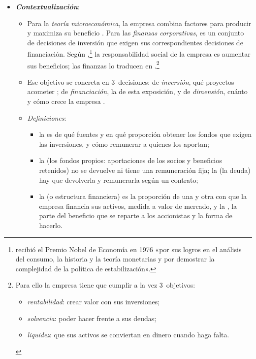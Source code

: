\documentclass[11pt]{article}
\begin{document}
\begin{itemize}
\item \textbf{\emph{Contextualización}}:
  \begin{itemize}
  \item Para la \emph{teoría microeconómica}, la empresa combina factores para producir y maximiza su beneficio . Para las \emph{finanzas corporativas}, es un conjunto de decisiones de inversión que exigen sus correspondientes decisiones de financiación. Según \textcite{Friedman1970Social},\footnote{ recibió el Premio Nobel de Economía en 1976 «por sus logros en el análisis del consumo, la historia y la teoría monetarias y por demostrar la complejidad de la política de estabilización»\nocite{Nobel1976Friedman}.} la responsabilidad social de la empresa es aumentar sus beneficios; las finanzas lo traducen en \nocite{Jensen2001Value}.\footnote{Para ello la empresa tiene que cumplir a la vez 3~objetivos:
\begin{itemize}
\item \emph{rentabilidad}: crear valor con sus inversiones;
\item \emph{solvencia}: poder hacer frente a sus deudas;
\item \emph{liquidez}: que sus activos se conviertan en dinero cuando haga falta.
\end{itemize}}
  \item Ese objetivo se concreta en 3~decisiones: de \emph{inversión}, qué proyectos acometer ; de \emph{financiación}, la de esta exposición, y de \emph{dimensión}, cuánto y cómo crece la empresa .
  \item \emph{Definiciones}:
    \begin{itemize}
    \item la  es de qué fuentes y en qué proporción obtener los fondos que exigen las inversiones, y cómo remunerar a quienes los aportan;
    \item la  (los fondos propios: aportaciones de los socios y beneficios retenidos) no se devuelve ni tiene una remuneración fija; la  (la deuda) hay que devolverla y remunerarla según un contrato;
    \item la  (o estructura financiera) es la proporción de una y otra con que la empresa financia sus activos, medida a valor de mercado, y la , la parte del beneficio que se reparte a los accionistas y la forma de hacerlo.

\end{itemize}
\end{itemize}
\end{itemize}
\end{document}
